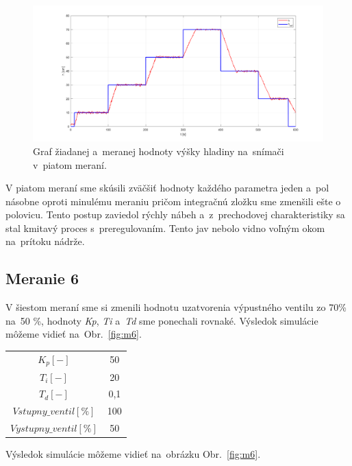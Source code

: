 \documentclass{article}
\begin{document}
\begin{figure}[!htbp]
	\begin{center}
		\includegraphics[width=\textwidth]{./include/meranie5.png}
	\end{center}
	\caption{Graf žiadanej a~meranej hodnoty výšky hladiny na~snímači v~piatom meraní.}
	\label{fig:m5}
\end{figure}

V piatom meraní sme skúsili zväčšiť hodnoty každého parametra jeden a~pol násobne oproti minulému meraniu 
pričom integračnú zložku sme zmenšili ešte o polovicu. Tento postup zaviedol rýchly nábeh a~z~prechodovej
charakteristiky sa stal kmitavý proces s~preregulovaním. Tento jav nebolo vidno voľným okom na~prítoku nádrže.

\clearpage

\subsection{Meranie 6}
\label{sec:meranie6}

V šiestom meraní sme si zmenili hodnotu uzatvorenia výpustného ventilu zo 70\% na~50 \%, hodnoty
\textit{Kp}, \textit{Ti} a~\textit{Td} sme ponechali rovnaké. Výsledok simulácie môžeme vidieť na~Obr.~\ref{fig:m6}.

\begin{center}
\begin{tabular}{ |c|c| }
 \hline
 $K_p [-]$ & 50 \\
 $T_i [-]$ & 20 \\
 $T_d [-]$ & 0,1 \\
 \hline
 $Vstupny\_ventil[\%]$ & 100 \\
 $Vystupny\_ventil[\%]$ & 50 \\
 \hline
\end{tabular}
\end{center}

Výsledok simulácie môžeme vidieť na~obrázku Obr.~\ref{fig:m6}.
\end{document}
